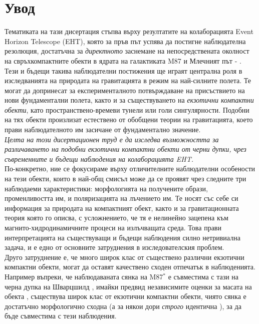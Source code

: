 \section{Увод}

Тематиката на тази дисертация стъпва върху резултатите на колаборацията Event Horizon Telescope (EHT), която за пръв път успява да постигне наблюдателна резолюция, достатъчна за \emph{директното} заснемане на непосредствената околност на свръхкомпактните обекти в ядрата на галактиката M87 и Млечният път \cite{EHT_M87_I} - \cite{EHT_SGR_VIII}. Тези и бъдещи такива наблюдателни постижения ще играят централна роля в изследванията на природата на гравитацията в режим на най-силните полета. Те могат да допринесат за експерименталното потвърждаване на присъствието на нови фундаментални полета, както и за съществуването на \emph{екзотични компактни обекти}, като пространствено-времеви тунели или голи сингулярности. Подобни на тях обекти произлизат естествено от обобщени теории на гравитацията, което прави наблюдателното им засичане от фундаментално значение.\\

\emph{Целта на този дисертационен труд е да изследва възможността за различаването на подобни екзотични компактни обекти от черни дупки, чрез съвременните и бъдещи наблюдения на колаборацията EHT.}\\

\noindent По-конкретно, ние се фокусираме върху отличителните наблюдателни особености на тези обекти, които в най-общ смисъл може да се проявят чрез следните три наблюдаеми характеристики: морфологията на получените образи, променливостта им, и поляризацията на лъчението им. Те носят със себе си информация за природата на компактният обект, както и за гравитационната теория която го описва, с усложнението, че тя е нелинейно зацепена към магнито-хидродинамичните процеси на излъчващата среда. Това прави интерпретацията на съществуващи и бъдещи наблюдения силно нетривиална задача, и е едно от основните затруднения в изследователския проблем.\\

\noindent Друго затруднение е, че много широк клас от съществено различни екзотични компактни обекти, могат да оставят качествено сходен отпечатък в наблюденията. Например въпреки, че наблюдаваната сянка на M87$^*$ е съвместима с тази на черна дупка на Шварцшилд \cite{EHT_M87_I}, имайки предвид независимите оценки за масата на обекта \cite{Gebhardt_2011}, съществува широк клас от екзотични компактни обекти, чиято сянка е достатъчно морфологично сходна (а за някои дори \emph{строго} идентична \cite{PhysRevD.103.084040}), за да бъде съвместима с тези наблюдения.\\

